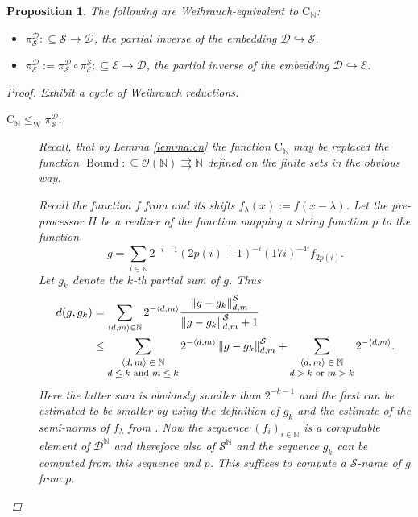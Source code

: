 \documentclass{eptcs-modified}
\newtheorem{proposition}[theorem]{Proposition}
\newcommand{\mto}{\rightrightarrows}
\newcommand{\leqW}{\leq_{\textrm{W}}}
\newcommand{\CCN}{\mathrm{C}_{\NN}}
\newcommand{\C}{\textrm{C}}
\newcommand{\NN}{\mathbb{N}}
\newcommand{\OO}{\mathcal{O}}
\newcommand{\EE}{\mathcal E}
\newcommand{\SF}{\mathcal S}
\newcommand{\TF}{\mathcal D}
\newcommand{\Bound}{\operatorname{Bound}}
\newcommand{\norm}[1]{\left\|#1\right\|}
\begin{document}
			\begin{proposition}
				The following are Weihrauch-equivalent to $\C_\mathbb{N}$:
				\begin{itemize}
					\item $\pi_\SF^\TF: \subseteq \SF\to \TF$, the partial inverse of the embedding $\TF\hookrightarrow \SF$.
					\item $\pi_\EE^\TF := \pi_\SF^\TF\circ\pi_\EE^\SF:\subseteq \EE \to \TF$, the partial inverse of the embedding $\TF\hookrightarrow \EE$.
				\end{itemize}
				\begin{proof}
					Exhibit a cycle of Weihrauch reductions:
					\begin{description}
						\item[$\C_\mathbb{N} \leqW \pi_\SF^\TF$:] Recall, that by Lemma \ref{lemma:cn} the function $\CCN$ may be replaced the function $\Bound:\subseteq \OO(\NN) \mto\NN$ defined on the finite sets in the obvious way.

						Recall the function $f$ from  and its shifts $f_{\lambda}(x):= f(x-\lambda)$.						
						Let the pre-processor $H$ be a realizer of the function mapping a string function $p$ to the function
						\[ g = \sum_{i\in \NN} 2^{-i-1}(2p(i)+1)^{-i}(17 i)^{-4 i} f_{2p(i)}. \]
						Let $g_k$ denote the $k$-th partial sum of $g$.
						Thus
						\begin{align*}
							d(g,g_k) & = \sum_{\langle d,m\rangle\in\NN} 2^{-\langle d,m\rangle} \frac{\norm{g-g_k}^\SF_{d,m}}{\norm{g-g_k}^\SF_{d,m}+1} \\
							& \leq \sum_{\footnotesize\begin{matrix} \langle d,m\rangle\in\NN \\ d\leq k\text{ and }m\leq k \end{matrix}} 2^{-\langle d,m\rangle} \norm{g-g_k}^\SF_{d,m} + \sum_{\footnotesize\begin{matrix} \langle d,m\rangle\in\NN \\ d> k\text{ or }m> k \end{matrix}} 2^{-\langle d,m\rangle}.
						\end{align*}
						Here the latter sum is obviously smaller than $2^{-k-1}$ and the first can be estimated to be smaller by using the definition of $g_k$ and the estimate of the semi-norms of $f_\lambda$ from .
						Now the sequence $(f_i)_{i\in\NN}$ is a computable element of $\TF^\NN$ and therefore also of $\SF^\NN$ and the sequence $g_k$ can be computed from this sequence and $p$.
						This suffices to compute a $\SF$-name of $g$ from $p$.


\end{description}
\end{proof}
\end{proposition}
\end{document}
